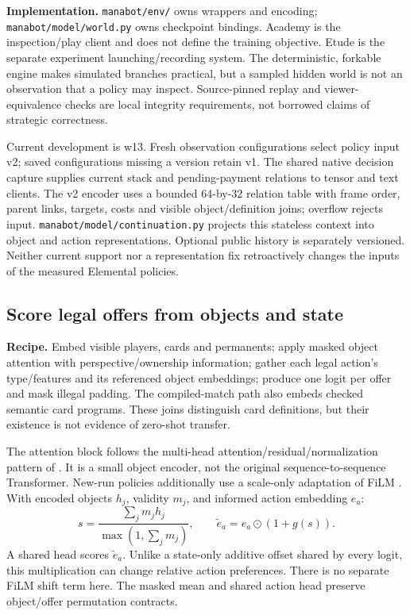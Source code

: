 \documentclass[11pt]{article}
\newcommand{\code}[1]{\texttt{\small #1}}
\begin{document}
\textbf{Implementation.} \code{manabot/env/} owns wrappers and encoding; \code{manabot/model/world.py} owns checkpoint bindings. Academy is the inspection/play client and does not define the training objective. Etude is the separate experiment launching/recording system. The deterministic, forkable engine makes simulated branches practical, but a sampled hidden world is not an observation that a policy may inspect. Source-pinned replay and viewer-equivalence checks are local integrity requirements, not borrowed claims of strategic correctness.

Current development is w13. Fresh observation configurations select policy input v2; saved configurations missing a version retain v1. The shared native decision capture supplies current stack and pending-payment relations to tensor and text clients. The v2 encoder uses a bounded 64-by-32 relation table with frame order, parent links, targets, costs and visible object/definition joins; overflow rejects input. \code{manabot/model/continuation.py} projects this stateless context into object and action representations. Optional public history is separately versioned. Neither current support nor a representation fix retroactively changes the inputs of the measured Elemental policies.

\subsection{Score legal offers from objects and state}

\textbf{Recipe.} Embed visible players, cards and permanents; apply masked object attention with perspective/ownership information; gather each legal action's type/features and its referenced object embeddings; produce one logit per offer and mask illegal padding. The compiled-match path also embeds checked semantic card programs. These joins distinguish card definitions, but their existence is not evidence of zero-shot transfer.

The attention block follows the multi-head attention/residual/normalization pattern of \citet{vaswani2017attention}. It is a small object encoder, not the original sequence-to-sequence Transformer. New-run policies additionally use a scale-only adaptation of FiLM \citep{perez2018film}. With encoded objects $h_j$, validity $m_j$, and informed action embedding $e_a$:
\[
 s=\frac{\sum_j m_jh_j}{\max(1,\sum_jm_j)},\qquad
 \widetilde e_a=e_a\odot(1+g(s)).
\]
A shared head scores $\widetilde e_a$. Unlike a state-only additive offset shared by every logit, this multiplication can change relative action preferences. There is no separate FiLM shift term here. The masked mean and shared action head preserve object/offer permutation contracts.
\end{document}
